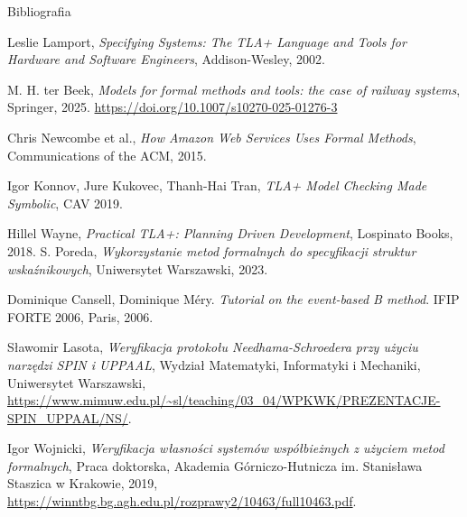 \documentclass{purdue-poster}
\begin{document}
\begin{frame}{}
\begin{columns}[T]
\begin{column}{.48\linewidth}

    \begin{block}{\large Bibliografia}
        {\scriptsize 
        \begin{thebibliography}{00}
        \setlength{\itemsep}{0pt}
        \setlength{\parskip}{0pt} 
            Leslie Lamport, \emph{Specifying Systems: The TLA+ Language and Tools for Hardware and Software Engineers}, Addison-Wesley, 2002.
            
            M. H. ter Beek, \emph{Models for formal methods and tools: the case of railway systems}, Springer, 2025.
            \url{https://doi.org/10.1007/s10270-025-01276-3}

            Chris Newcombe et al., \emph{How Amazon Web Services Uses Formal Methods}, Communications of the ACM, 2015.
          
            Igor Konnov, Jure Kukovec, Thanh-Hai Tran, \emph{TLA+ Model Checking Made Symbolic}, CAV 2019.
          
            Hillel Wayne, \emph{Practical TLA+: Planning Driven Development}, Lospinato Books, 2018.
            S. Poreda,
            \textit{Wykorzystanie metod formalnych do specyfikacji struktur wskaźnikowych},
            Uniwersytet Warszawski, 2023.

    Dominique Cansell, Dominique Méry. \emph{Tutorial on the event-based B method}. IFIP FORTE 2006, Paris, 2006.
        
            Sławomir Lasota,
            \textit{Weryfikacja protokołu Needhama-Schroedera przy użyciu narzędzi SPIN i UPPAAL},
            Wydział Matematyki, Informatyki i Mechaniki, Uniwersytet Warszawski,
            \url{https://www.mimuw.edu.pl/~sl/teaching/03_04/WPKWK/PREZENTACJE-SPIN_UPPAAL/NS/}.
        
            Igor Wojnicki,
            \textit{Weryfikacja własności systemów współbieżnych z użyciem metod formalnych},
            Praca doktorska, Akademia Górniczo-Hutnicza im. Stanisława Staszica w Krakowie, 2019,
            \url{https://winntbg.bg.agh.edu.pl/rozprawy2/10463/full10463.pdf}.


\end{thebibliography}}
\end{block}
\end{column}
\end{columns}
\end{frame}
\end{document}
